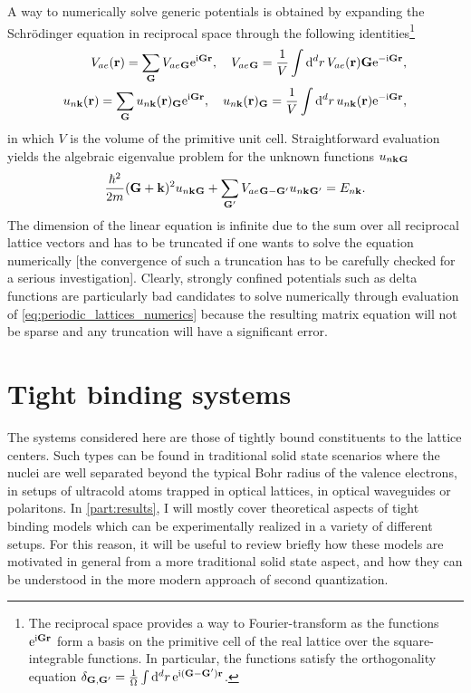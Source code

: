 A way to numerically solve generic potentials is obtained by expanding the Schrödinger equation in reciprocal space through the following identities\footnote{The reciprocal space provides a way to Fourier-transform as the functions $\mathrm e^{\mathrm i {\bf G r}}$ form a basis on the primitive cell of the real lattice over the square-integrable functions. In particular, the functions satisfy the orthogonality equation $\delta_{\bf G, G'}=\frac1{\Omega}\int\mathrm d^dr\,\mathrm e^{\mathrm i({\bf G-G'}){\bf r}}$.}
\begin{align}
    V_{ae}({\bf r}) = \sum_{\bf G}V_{ae}{}_{\bf G}\mathrm e^{\mathrm i {\bf G r}},
    \quad
    V_{ae}{}_{\bf G} = \frac1{V}\int\mathrm d^dr\,V_{ae}({\bf r}){\bf G}\mathrm e^{-\mathrm i {\bf G r}},
    \\
    u_{n{\bf k}}({\bf r}) = \sum_{\bf G}u_{n{\bf k}}({\bf r}){}_{\bf G}\mathrm e^{\mathrm i {\bf G r}},
    \quad
    u_{n{\bf k}}({\bf r}){}_{\bf G} = \frac1{V}\int\mathrm d^dr\,u_{n{\bf k}}({\bf r})\mathrm e^{-\mathrm i {\bf G r}},
\end{align}
in which $V$ is the volume of the primitive unit cell.
Straightforward evaluation yields the algebraic eigenvalue problem for the unknown functions $u_{n{\bf k}}{}_{\bf G}$
\begin{align}
    \frac{\hbar^2}{2m}({\bf G}+{\bf k})^2u_{n{\bf k}}{}_{\bf G}+\sum_{\bf G'}V_{ae}{}_{\bf G-G'}u_{n{\bf k}}{}_{\bf G'} = E_{n{\bf k}}.
    \label{eq:periodic_lattices_numerics}
\end{align}
The dimension of the linear equation is infinite due to the sum over all reciprocal lattice vectors and has to be truncated if one wants to solve the equation numerically [the convergence of such a truncation has to be carefully checked for a serious investigation].
Clearly, strongly confined potentials such as delta functions are particularly bad candidates to solve numerically through evaluation of \cref{eq:periodic_lattices_numerics} because the resulting matrix equation will not be sparse and any truncation will have a significant error.
%
%
\section{Tight binding systems}
\label{sec:tight_binding_systems}
The systems considered here are those of tightly bound constituents to the lattice centers.
Such types can be found in traditional solid state scenarios where the nuclei are well separated beyond the typical Bohr radius of the valence electrons, in setups of ultracold atoms trapped in optical lattices, in optical waveguides or polaritons.
In \cref{part:results}, I will mostly cover theoretical aspects of tight binding models which can be experimentally realized in a variety of different setups.
For this reason, it will be useful to review briefly how these models are motivated in general from a more traditional solid state aspect, and how they can be understood in the more modern approach of second quantization.
\\


